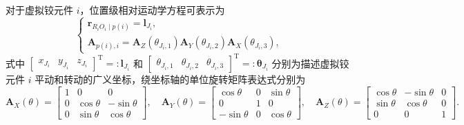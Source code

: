 对于虚拟铰元件 $i$，位置级相对运动学方程可表示为
\begin{equation}\label{eq:10.11}
  \begin{cases}
    \boldsymbol{r}_{R_i O_i \mid p(i)} = \boldsymbol{l}_{J_i}, \\
    \boldsymbol{A}_{p(i),i} = \boldsymbol{A}_Z(\theta_{J_i,1}) \boldsymbol{A}_Y(\theta_{J_i,2}) \boldsymbol{A}_X(\theta_{J_i,3}),
  \end{cases}
\end{equation}
式中 $\begin{bmatrix} x_{J_i} & y_{J_i} & z_{J_i} \end{bmatrix}^{\mathrm{T}} =: \boldsymbol{l}_{J_i}$ 和 $\begin{bmatrix} \theta_{J_i,1} & \theta_{J_i,2} & \theta_{J_i,3} \end{bmatrix}^{\mathrm{T}} =: \boldsymbol{\theta}_{J_i}$ 分别为描述虚拟铰元件 $i$ 平动和转动的广义坐标，绕坐标轴的单位旋转矩阵表达式分别为
\begin{equation}\label{eq:10.11b}
  \boldsymbol{A}_X(\theta) = \begin{bmatrix} 1 & 0 & 0 \\ 0 & \cos\theta & -\sin\theta \\ 0 & \sin\theta & \cos\theta \end{bmatrix}, \quad
  \boldsymbol{A}_Y(\theta) = \begin{bmatrix} \cos\theta & 0 & \sin\theta \\ 0 & 1 & 0 \\ -\sin\theta & 0 & \cos\theta \end{bmatrix}, \quad
  \boldsymbol{A}_Z(\theta) = \begin{bmatrix} \cos\theta & -\sin\theta & 0 \\ \sin\theta & \cos\theta & 0 \\ 0 & 0 & 1 \end{bmatrix}.
\end{equation}

